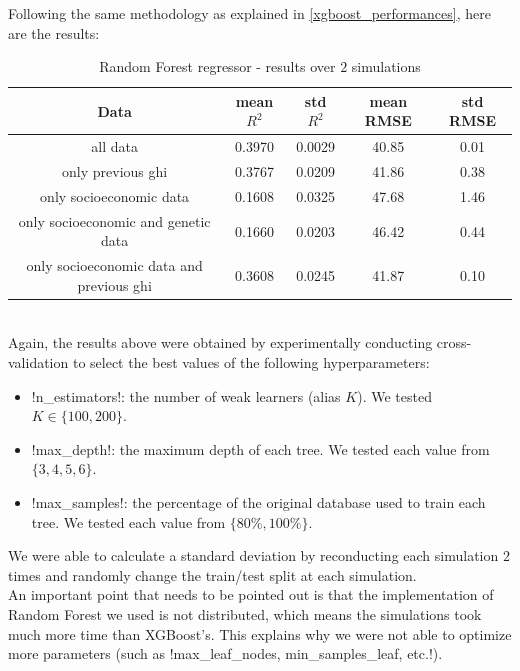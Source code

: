 \documentclass[]{article}
\begin{document}
\noindent
Following the same methodology as explained in \ref{xgboost_performances}, here are the results:
\begin{table}[!h]
	\centering
	\begin{tabular}{|c|c|c|c|c|}
		\hline
		\textbf{Data} & \textbf{mean $R^2$} & \textbf{std $R^2$} & \textbf{mean RMSE} & \textbf{std RMSE}\\
		\hline
		all data & 0.3970 & 0.0029 & 40.85 & 0.01 \\ 
		\hline
		only previous ghi & 0.3767 & 0.0209 & 41.86 & 0.38\\
		\hline 
		only socioeconomic data & 0.1608 & 0.0325 & 47.68 & 1.46\\
		\hline 
		only socioeconomic and genetic data & 0.1660 & 0.0203 & 46.42 & 0.44\\
		\hline 
		only socioeconomic data and previous ghi & 0.3608 &	0.0245 & 41.87 & 0.10\\
		\hline
	\end{tabular}
	\caption{Random Forest regressor - results over $2$ simulations}
	\label{results_randomforestregressor}
\end{table}\\
Again, the results above were obtained by experimentally conducting cross-validation to select the best values of the following hyperparameters:
\begin{itemize}
	\item \pyth!n_estimators!: the number of weak learners (alias $K$). We tested $K\in \{100, 200\}$.
	\item \pyth!max_depth!: the maximum depth of each tree. We tested each value from $\{3, 4, 5, 6\}$.
	\item \pyth!max_samples!: the percentage of the original database used to train each tree. We tested each value from $\{80\%, 100\%\}$.
\end{itemize}
We were able to calculate a standard deviation by reconducting each simulation $2$ times and randomly change the train/test split at each simulation.\\

\noindent
An important point that needs to be pointed out is that the \sklearn implementation of Random Forest we used is not distributed, which means the simulations took much more time than XGBoost's. This explains why we were not able to optimize more parameters (such as \pyth!max_leaf_nodes, min_samples_leaf, etc.!).\\
\end{document}
